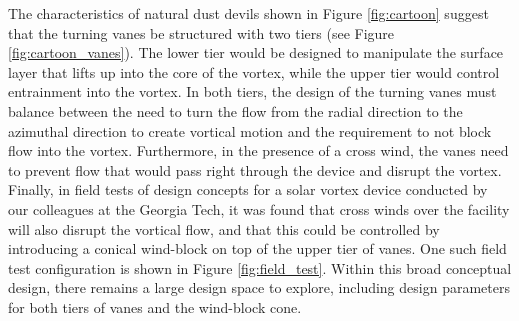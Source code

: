 


The characteristics of natural dust devils shown in Figure
\ref{fig:cartoon} suggest that the turning vanes be structured with two
tiers (see Figure \ref{fig:cartoon_vanes}). The lower tier would be
designed to manipulate the surface layer 
that lifts up into the core of the vortex, while the upper tier would
control entrainment into the vortex. In both tiers, the design of the
turning vanes must balance between the need to turn the flow from the
radial direction to the azimuthal direction to create vortical motion
and the requirement to not block flow into the vortex. Furthermore, in
the presence of a cross wind, the vanes need to prevent flow that
would pass right through the device and disrupt the vortex.
Finally, in field tests of design concepts for a solar vortex device
conducted by our colleagues at the Georgia Tech, it was found that cross
winds over the facility will also disrupt the vortical flow, and that
this could be controlled by introducing a conical wind-block on top of
the upper tier of vanes. One such field test configuration is shown in
Figure \ref{fig:field_test}. Within this broad conceptual design, there
remains a large design space to explore, including design parameters for
both tiers of vanes and the wind-block cone.

